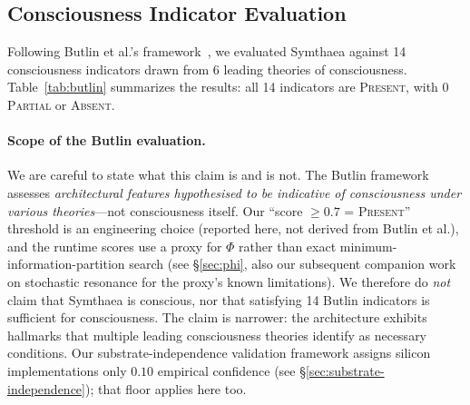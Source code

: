 \documentclass[10pt,letterpaper]{article}
\renewcommand{\Phi}{\varPhi}
\begin{document}
\subsection{Consciousness Indicator Evaluation}
\label{sec:butlin}

Following Butlin et al.'s framework~\cite{butlin2023consciousness}, we evaluated Symthaea against 14 consciousness indicators drawn from 6 leading theories of consciousness.  Table~\ref{tab:butlin} summarizes the results: all 14 indicators are \textsc{Present}, with 0 \textsc{Partial} or \textsc{Absent}.

\paragraph{Scope of the Butlin evaluation.} We are careful to state what this claim is and is not. The Butlin framework assesses \emph{architectural features hypothesised to be indicative of consciousness under various theories}---not consciousness itself. Our ``score $\geq 0.7$ = \textsc{Present}'' threshold is an engineering choice (reported here, not derived from Butlin et al.), and the runtime scores use a proxy for $\Phi$ rather than exact minimum-information-partition search (see \S\ref{sec:phi}, also our subsequent companion work on stochastic resonance for the proxy's known limitations). We therefore do \emph{not} claim that Symthaea is conscious, nor that satisfying 14 Butlin indicators is sufficient for consciousness. The claim is narrower: the architecture exhibits hallmarks that multiple leading consciousness theories identify as necessary conditions. Our substrate-independence validation framework assigns silicon implementations only $0.10$ empirical confidence (see \S\ref{sec:substrate-independence}); that floor applies here too.
\end{document}
